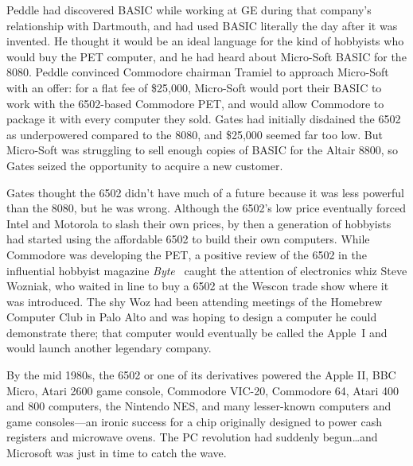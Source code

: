 Peddle had discovered BASIC while working at GE during that company's
relationship with Dartmouth, and had used BASIC literally the day after
it was invented.  He thought it would be an ideal language for the kind
of hobbyists who would buy the PET computer, and he had heard about Micro-Soft
BASIC for the 8080.
Peddle convinced Commodore chairman Tramiel to approach Micro-Soft with
an offer: for a flat fee of \$25,000,
Micro-Soft would port their BASIC to work with the 6502-based Commodore
PET, and would 
allow Commodore to package it with every computer they sold.
Gates had initially disdained the 6502 as underpowered compared to the
8080, and \$25,000 seemed far too low.  But Micro-Soft was struggling to
sell enough copies of BASIC for the Altair 8800, so Gates
seized the opportunity to acquire a new customer.

Gates thought the 6502 didn't have much of a future because it was less
powerful than the 8080, but he was wrong.
Although the 6502's low price eventually forced Intel and Motorola to slash
their own prices, by then a generation of
hobbyists had started using the affordable 6502 to build their own computers.
While Commodore was developing the PET, a positive review of the 6502 in
the influential hobbyist magazine \emph{Byte}~\cite{byte75:6502} caught
the attention of electronics whiz Steve Wozniak, who waited in line to
buy a 6502 at the 
Wescon trade show where it was introduced.
The shy Woz had been attending meetings of the Homebrew Computer Club in
Palo Alto and was hoping to design a computer he could demonstrate
there; that computer would eventually be called the Apple~I and would
launch another legendary company.

By the mid 1980s, the 6502 or one of its derivatives powered the Apple
II, BBC Micro, Atari 2600 game console, Commodore VIC-20, Commodore 64,
Atari 400 and 800 computers, the Nintendo NES, and many lesser-known
computers and game consoles---an ironic success for a chip
originally designed to power cash registers and microwave ovens.
The PC revolution had suddenly begun\ldots{}and Microsoft was just in time
to catch the wave.

